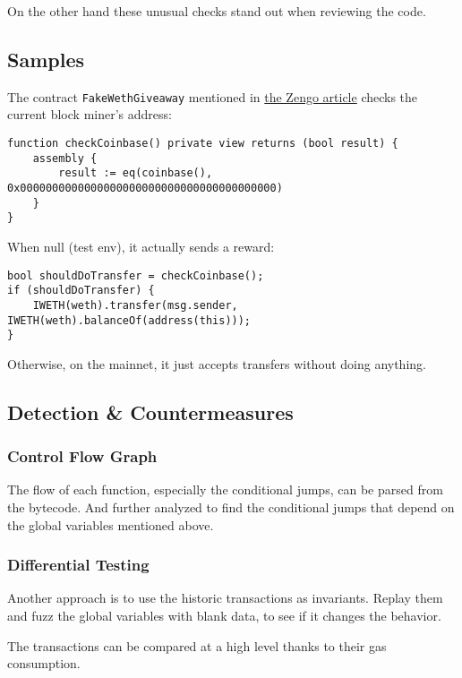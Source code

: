 On the other hand these unusual checks stand out when reviewing the code.

\subsection{Samples}

The contract \lstinline{FakeWethGiveaway} mentioned in \href{\urlarticleredpill}{the Zengo article} checks the current block miner’s address:

\begin{lstlisting}[language=Solidity]
function checkCoinbase() private view returns (bool result) {
    assembly {
        result := eq(coinbase(), 0x0000000000000000000000000000000000000000)
    }
}
\end{lstlisting}

When null (test env), it actually sends a reward:

\begin{lstlisting}[language=Solidity]
bool shouldDoTransfer = checkCoinbase();
if (shouldDoTransfer) {
    IWETH(weth).transfer(msg.sender, IWETH(weth).balanceOf(address(this)));
}
\end{lstlisting}

Otherwise, on the mainnet, it just accepts transfers without doing anything.

\subsection{Detection \& Countermeasures}

\subsubsection{Control Flow Graph}

The flow of each function, especially the conditional jumps, can be parsed from the bytecode.
And further analyzed to find the conditional jumps that depend on the global variables mentioned above.

\subsubsection{Differential Testing}

Another approach is to use the historic transactions as invariants.
Replay them and fuzz the global variables with blank data, to see if it changes the behavior.

The transactions can be compared at a high level thanks to their gas consumption.
